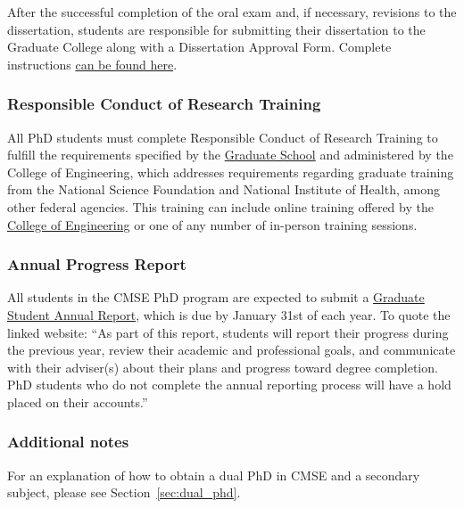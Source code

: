 \noindent
After the successful completion of the oral exam and, if necessary,
revisions to the dissertation, students are responsible for submitting
their dissertation to the Graduate College along with a Dissertation
Approval Form.  Complete
instructions \href{https://grad.msu.edu/etd}{can be found here}.




\vspace{3mm}
\subsubsection{Responsible Conduct of Research Training}

All PhD students must complete Responsible Conduct of Research
Training to fulfill the requirements specified by the \href{http://grad.msu.edu/rcr/}{Graduate
School} and administered by the College of Engineering, which addresses requirements regarding
graduate training from the National Science Foundation and National
Institute of Health, among other federal agencies.  This training can
include online training offered by the \href{https://www.egr.msu.edu/secureresearchcourses/}{College of
Engineering}  or one of
any number of in-person training sessions.

\vspace{3mm}
\subsubsection{Annual Progress Report}

All students in the CMSE PhD program are expected to submit a
\href{https://www.egr.msu.edu/academics/graduate/graduate-student-annual-reporting-requirements}{Graduate
  Student Annual Report}, which is due by January 31st of each year.
To quote the linked website:  ``As part of this report, students will
report their progress during the previous year, review their academic
and professional goals, and communicate with their adviser(s) about
their plans and progress toward degree completion. PhD students who do
not complete the annual reporting process will have a hold placed on
their accounts.''  

\vspace{3mm}
\subsubsection{Additional notes}

For an explanation of how to obtain a dual PhD in CMSE and a secondary
subject, please see Section~\ref{sec:dual_phd}.




